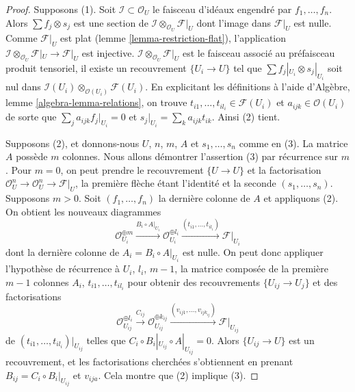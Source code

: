 \begin{proof}

Supposons (1). Soit $\mathcal{I} \subset \mathcal{O}_U$ le faisceau
d'idéaux engendré par $f_1, \ldots, f_n$. Alors
$\sum f_j \otimes s_j$ est une section de
$\mathcal{I} \otimes_{\mathcal{O}_U} \mathcal{F}|_U$
dont l'image dans $\mathcal{F}|_U$ est nulle. Comme $\mathcal{F}|_U$ est
plat (lemme \ref{lemma-restriction-flat}), l'application
$\mathcal{I} \otimes_{\mathcal{O}_U} \mathcal{F}|_U \to \mathcal{F}|_U$
est injective. $\mathcal{I} \otimes_{\mathcal{O}_U} \mathcal{F}|_U$
est le faisceau associé au préfaisceau produit tensoriel, il existe un
recouvrement $\{U_i \to U\}$ tel que
$\sum f_j|_{U_i} \otimes s_j|_{U_i}$ soit nul dans
$\mathcal{I}(U_i) \otimes_{\mathcal{O}(U_i)} \mathcal{F}(U_i)$. En
explicitant les définitions à l'aide d'Algèbre, lemme
\ref{algebra-lemma-relations}, on trouve
$t_{i1}, \ldots, t_{i l_i} \in \mathcal{F}(U_i)$ et
$a_{ijk} \in \mathcal{O}(U_i)$
de sorte que $\sum_j a_{ijk}f_j|_{U_i} = 0$ et
$s_j|_{U_i} = \sum_k a_{ijk}t_{ik}$. Ainsi (2) tient.

\medskip\noindent

Supposons (2), et donnons-nous $U$, $n$, $m$, $A$ et
$s_1, \ldots, s_n$ comme en (3). La matrice $A$ possède $m$ colonnes.
Nous allons démontrer l'assertion (3) par récurrence sur $m$. Pour
$m = 0$, on peut prendre le recouvrement $\{U \to U\}$ et la factorisation
$\mathcal{O}_U^n \to \mathcal{O}_U^n \to \mathcal{F}|_U$, la première
flèche étant l'identité et la seconde $(s_1, \ldots, s_n)$. Supposons
$m > 0$. Soit $(f_1, \ldots, f_n)$ la dernière colonne de $A$ et appliquons
(2). On obtient les nouveaux diagrammes
$$
\mathcal{O}_{U_i}^{\oplus m} \xrightarrow{B_i \circ A|_{U_i}}
\mathcal{O}_{U_i}^{\oplus l_i} \xrightarrow{(t_{i1}, \ldots, t_{il_i})}
\mathcal{F}|_{U_i}
$$
dont la dernière colonne de $A_i = B_i \circ A|_{U_i}$ est nulle.
On peut donc appliquer l'hypothèse de récurrence à
$U_i$, $l_i$, $m - 1$, la matrice composée de la première $m - 1$ colonnes $A_i$, $t_{i1}, \ldots, t_{il_i}$
pour obtenir des recouvrements $\{U_{ij} \to U_j\}$ et des factorisations
$$
\mathcal{O}_{U_{ij}}^{\oplus l_i}
\xrightarrow{C_{ij}}
\mathcal{O}_{U_{ij}}^{\oplus k_{ij}}
\xrightarrow{(v_{ij1}, \ldots, v_{ij k_{ij}})}
\mathcal{F}|_{U_{ij}}
$$
de $(t_{i1}, \ldots, t_{il_i})|_{U_{ij}}$ telles que
$C_i \circ B_i|_{U_{ij}} \circ A|_{U_{ij}} = 0$. Alors
$\{U_{ij} \to U\}$ est un recouvrement, et les factorisations cherchées
s'obtiennent en prenant $B_{ij} = C_i \circ B_i|_{U_{ij}}$ et
$v_{ija}$. Cela montre que (2) implique (3).


\end{proof}
